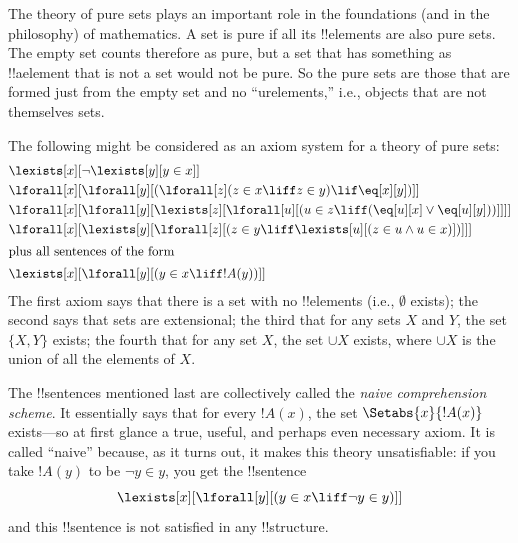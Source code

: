 \documentclass[../../../include/open-logic-section]{subfiles}
\begin{document}
\begin{ex}
The theory of pure sets plays an important role in the foundations
(and in the philosophy) of mathematics.  A set is pure if all its
!!{element}s are also pure sets.  The empty set counts therefore as
pure, but a set that has something as !!a{element} that is not a set
would not be pure.  So the pure sets are those that are formed just
from the empty set and no ``urelements,'' i.e., objects that are not
themselves sets.

The following might be considered as an axiom system for a theory of
pure sets:
\begin{align*}
& \lexists[x][\lnot \lexists[y][y \in x]]\\
& \lforall[x][\lforall[y][(\lforall[z](z \in x \liff z \in y) \lif 
\eq[x][y])]]\\
& \lforall[x][\lforall[y][\lexists[z][\lforall[u][(u \in z \liff
(\eq[u][x] \lor \eq[u][y]))]]]]\\
& \lforall[x][\lexists[y][\lforall[z][(z \in y \liff \lexists[u][(z \in
        u \land u \in x)])]]]\\
\intertext{plus all sentences of the form} &
\lexists[x][\lforall[y][(y \in x \liff !A(y))]]
\end{align*}
The first axiom says that there is a set with no !!{element}s (i.e.,
$\emptyset$ exists); the second says that sets are extensional; the
third that for any sets $X$ and $Y$, the set $\{X, Y\}$ exists; the
fourth that for any set $X$, the set $\cup X$ exists, where $\cup X$ is the 
union of all the elements of $X$.

The !!{sentence}s mentioned last are collectively called the
\emph{naive comprehension scheme}.  It essentially says that for every
$!A(x)$, the set $\Setabs{x}{!A(x)}$ exists---so at first glance a
true, useful, and perhaps even necessary axiom.  It is called ``naive''
because, as it turns out, it makes this theory unsatisfiable: if you
take $!A(y)$ to be $\lnot y \in y$, you get the !!{sentence}
\[
\lexists[x][\lforall[y][(y \in x \liff \lnot y \in y)]]
\]
and this !!{sentence} is not satisfied in any !!{structure}.
\end{ex}
\end{document}
